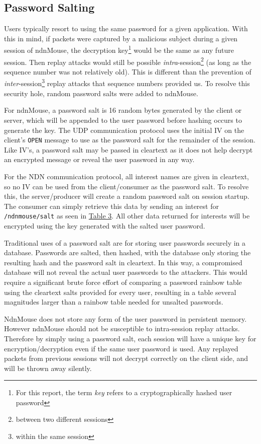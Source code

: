 \documentclass{sig-alternate}
\renewcommand\_{\textunderscore\allowbreak}  %
\begin{document}
\subsection{Password Salting}
Users typically resort to using the same password for a given application. With this in mind, if packets were captured by a malicious subject during a given session of ndnMouse, the decryption key\footnote{For this report, the term \textit{key} refers to a cryptographically hashed user password} would be the same as any future session. Then replay attacks would still be possible \textit{intra}-session\footnote{between two different sessions} (as long as the sequence number was not relatively old). This is different than the prevention of \textit{inter}-session\footnote{within the same session} replay attacks that sequence numbers provided us. To resolve this security hole, random password salts were added to ndnMouse.

For ndnMouse, a password salt is 16 random bytes generated by the client or server, which will be appended to the user password before hashing occurs to generate the key. The UDP communication protocol uses the initial IV on the client's \texttt{OPEN} message to use as the password salt for the remainder of the session. Like IV's, a password salt may be passed in cleartext as it does not help decrypt an encrypted message or reveal the user password in any way. 

For the NDN communication protocol, all interest names are given in cleartext, so no IV can be used from the client/consumer as the password salt. To resolve this, the server/producer will create a random password salt on session startup. The consumer can simply retrieve this data by sending an interest for \texttt{/ndnmouse/salt} as seen in \hyperlink{tab:ndnInterestNames}{Table 3}. All other data returned for interests will be encrypted using the key generated with the salted user password.

Traditional uses of a password salt are for storing user passwords securely in a database. Passwords are salted, then hashed, with the database only storing the resulting hash and the password salt in cleartext. In this way, a compromised database will not reveal the actual user passwords to the attackers. This would require a significant brute force effort of comparing a password rainbow table using the cleartext salts provided for every user, resulting in a table several magnitudes larger than a rainbow table needed for unsalted passwords. 

NdnMouse does not store any form of the user password in persistent memory. However ndnMouse should not be susceptible to intra-session replay attacks. Therefore by simply using a password salt, each session will have a unique key for encryption/decryption even if the same user password is used. Any replayed packets from previous sessions will not decrypt correctly on the client side, and will be thrown away silently.
\end{document}

